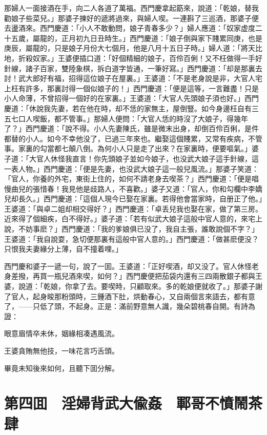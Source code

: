 那婦人一面接酒在手，向二人各道了萬福。西門慶拿起筯來，說道：「乾娘，替我勸娘子些菜兒。」那婆子揀好的遞將過來，與婦人喫。一連斟了三巡酒，那婆子便去盪酒來。西門慶道：「小人不敢動問，娘子青春多少？」婦人應道：「奴家虚度二十五歲，屬龍的，正月初九日丑時生。」西門慶道：「娘子倒與家下賤累同庚，也是庚辰，屬龍的，只是娘子月份大七個月，他是八月十五日子時。」婦人道：「將天比地，折殺奴家。」王婆便插口道：「好個精細的娘子，百伶百俐！又不枉做得一手好針線，諸子百家，雙陸象棋，拆白道字皆通，一筆好寫。」西門慶道：「却是那裏去討！武大郎好有福，招得這位娘子在屋裏。」王婆道：「不是老身說是非，大官人宅上枉有許多，那裏討得一個似娘子的！」西門慶道：「便是這等，一言難盡！只是小人命薄，不曾招得一個好的在家裏。」王婆道：「大官人先頭娘子須也好。」西門慶道：「休說我先妻，若在他在時，却不恁的家無主，屋倒豎。如今身邊枉自有三五七口人喫飯，都不管事。」那婦人便問：「大官人恁的時沒了大娘子，得幾年了？」西門慶道：「說不得。小人先妻陳氏，雖是微末出身，却倒百伶百俐，是件都替的小人。如今不幸他没了，已過三年來也。繼娶這個賤累，又常有疾病，不管事。家裏的勾當都七顛八倒。為何小人只是走了出來？在家裏時，便要嘔氣。」婆子道：「大官人休怪我直言！你先頭娘子並如今娘子，也没武大娘子這手針線，這一表人物。」西門慶道：「便是先妻，也没武大娘子這一般兒風流。」那婆子笑道：「官人，你養的外宅，東街上住的，如何不請老身去喫茶？」西門慶道：「便是唱慢曲兒的張惜春！我見他是歧路人，不喜歡。」婆子又道：「官人，你和勾欄中李嬌兒却長久。」西門慶道：「這個人現今已娶在家裏。若得他會當家時，自册正了他。」王婆道：「與卓二姐却相交得好？」西門慶道：「卓丢兒我也娶在家，做了第三房。近來得了個細疾，白不得好。」婆子道：「若有似武大娘子這般中官人意的，來宅上說，不妨事麽？」西門慶道：「我的爹娘俱已没了，我自主張，誰敢說個不字？」王婆道：「我自說耍，急切便那裏有這般中官人意的。」西門慶道：「做甚麽便没？只恨我夫妻緣分上薄，自不撞着哩。」

西門慶和婆子一遞一句，說了一囬。王婆道：「正好喫酒，却又没了。官人休怪老身差撥，再買一瓶兒酒來喫，如何？」西門慶便把茄袋内還有三四兩散銀子都與王婆，說道：「乾娘，你拿了去。要喫時，只顧取來。多的乾娘便就收了。」那婆子謝了官人，起身睃那粉頭時，三鍾酒下肚，烘動春心，又自兩個言來語去，都有意了，——只低了頭，不起身。正是：滿前野意無人識，幾朵碧桃春自開。有詩為證：

眼意眉情卒未休，姻緣相凑遇風流。

王婆貪賄無他技，一味花言巧舌頭。

畢竟未知後來如何，且聽下囬分解。

\chapter*{第四囬　淫婦背武大偸姦　鄆哥不憤鬧茶肆}

